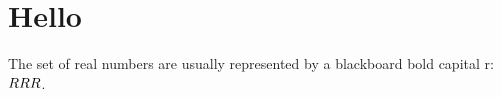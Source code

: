 \documentclass[../article.tex]{subfiles}
\begin{document}
\section{Hello}

The set of real numbers are usually represented
by a blackboard bold capital r: \( RRR \).
\end{document}
